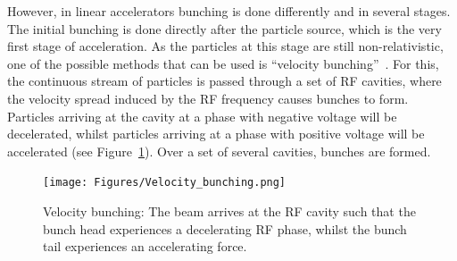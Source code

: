 However, in linear accelerators bunching is done differently and in several stages.
The initial bunching is done directly after the particle source, which is the very first stage of acceleration.
As the particles at this stage are still non-relativistic, one of the possible methods that can be used is ``velocity bunching''~\cite[cf. p. 541ff]{Wiedemann}.
For this, the continuous stream of particles is passed through a set of RF cavities, where the velocity spread induced by the RF frequency causes bunches to form.
Particles arriving at the cavity at a phase with negative voltage will be decelerated, whilst particles arriving at a phase with positive voltage will be accelerated (see Figure~\ref{fig:Velocity_bunching}).
Over a set of several cavities, bunches are formed.
\begin{figure}
\centering
\texttt{[image: Figures/Velocity\_bunching.png]}
\caption[Velocity bunching]{Velocity bunching: The beam arrives at the RF cavity such that the bunch head experiences a decelerating RF phase, whilst the bunch tail experiences an accelerating force.}
\label{fig:Velocity_bunching}
\end{figure}

